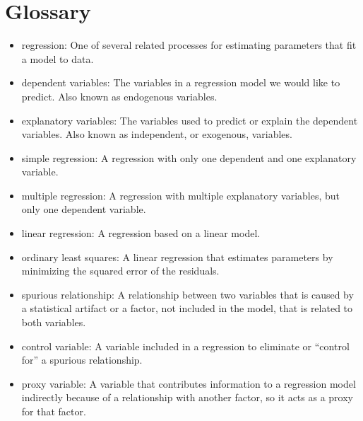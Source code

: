 \documentclass[12pt]{book}
\begin{document}
\section{Glossary}

\begin{itemize}

\item regression: One of several related processes for estimating parameters
that fit a model to data.

\item dependent variables: The variables in a regression model we would
like to predict.  Also known as endogenous variables.

\item explanatory variables: The variables used to predict or explain
the dependent variables.  Also known as independent, or exogenous,
variables.

\item simple regression: A regression with only one dependent and
one explanatory variable.

\item multiple regression: A regression with multiple explanatory
variables, but only one dependent variable.

\item linear regression: A regression based on a linear model.

\item ordinary least squares: A linear regression that estimates
parameters by minimizing the squared error of the residuals.

\item spurious relationship: A relationship between two variables that is 
caused by a statistical artifact or a factor, not included in the
model, that is related to both variables.

\item control variable: A variable included in a regression to
eliminate or ``control for'' a spurious relationship.

\item proxy variable: A variable that contributes information to
a regression model indirectly because of a relationship with another
factor, so it acts as a proxy for that factor.


\end{itemize}
\end{document}
